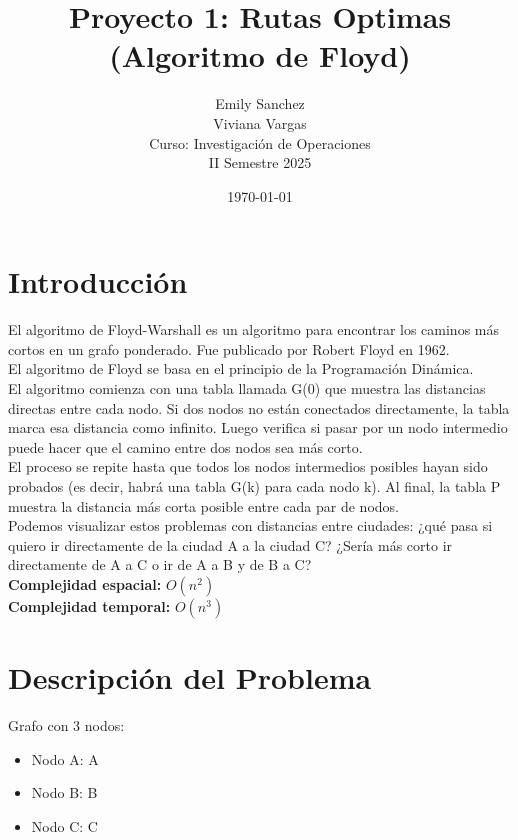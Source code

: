 \documentclass[12pt]{article}
\title{Proyecto 1: Rutas Optimas (Algoritmo de Floyd)}
\author{Emily Sanchez \\ Viviana Vargas \\[1cm] Curso: Investigación de Operaciones \\ II Semestre 2025}
\date{\today}
\begin{document}
\maketitle
\thispagestyle{empty}
\newpage
\setcounter{page}{1}

\section{Introducción}
El algoritmo de Floyd-Warshall es un algoritmo para encontrar los caminos más cortos en un grafo ponderado. Fue publicado por Robert Floyd en 1962.\\
El algoritmo de Floyd se basa en el principio de la Programación Dinámica.\\
El algoritmo comienza con una tabla llamada G(0) que muestra las distancias directas entre cada nodo. Si dos nodos no están conectados directamente, la tabla marca esa distancia como infinito. Luego verifica si pasar por un nodo intermedio puede hacer que el camino entre dos nodos sea más corto.\\
El proceso se repite hasta que todos los nodos intermedios posibles hayan sido probados (es decir, habrá una tabla G(k) para cada nodo k). Al final, la tabla P muestra la distancia más corta posible entre cada par de nodos.\\
Podemos visualizar estos problemas con distancias entre ciudades: ¿qué pasa si quiero ir directamente de la ciudad A a la ciudad C? ¿Sería más corto ir directamente de A a C o ir de A a B y de B a C?\\
\textbf{Complejidad espacial:} $O(n^2)$\\
\textbf{Complejidad temporal:} $O(n^3)$\\
\clearpage
\section{Descripción del Problema}
Grafo con 3 nodos:

\begin{itemize}
\item Nodo A: A
\item Nodo B: B
\item Nodo C: C
\end{itemize}
\end{document}
